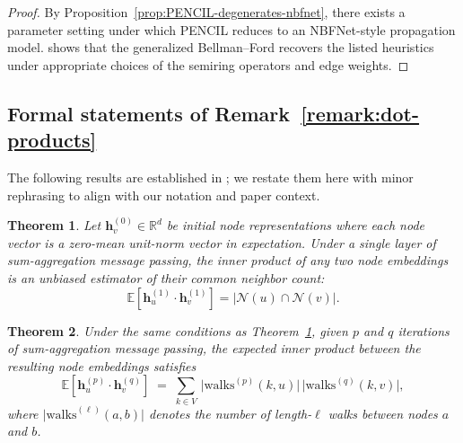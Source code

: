 \documentclass{article}
\theoremstyle{plain}
\newtheorem{theorem}{Theorem}[section]
\theoremstyle{definition}
\theoremstyle{remark}
\begin{document}
\begin{proof}
    By Proposition~\ref{prop:PENCIL-degenerates-nbfnet}, there exists a parameter setting under which PENCIL reduces to an
    NBFNet-style propagation model. \cite{zhu_neural_bellman-ford_2021} shows that the generalized Bellman--Ford recovers the listed heuristics under appropriate choices of the semiring operators and edge weights.
\end{proof}

\subsection{Formal statements of Remark~\ref{remark:dot-products}} \label{app:formal-theorems}

The following results are established in \cite{dong_pure_2024}; we restate them here with minor rephrasing to align with our notation and paper context.

\begin{theorem}{\cite{dong_pure_2024}} \label{thm:common-neighbor-estimation}
    Let $\mathbf{h}_v^{(0)} \in \mathbb{R}^d$ be initial node representations where each node vector is a zero-mean unit-norm vector in expectation. Under a single layer of sum-aggregation message passing, the inner product of any two node embeddings is an unbiased estimator of their common neighbor count:
    \begin{equation}
        \mathbb{E}\!\left[\mathbf{h}_u^{(1)} \cdot \mathbf{h}_v^{(1)}\right] = |\mathcal{N}(u) \cap \mathcal{N}(v)|.
    \end{equation}
\end{theorem}

\begin{theorem}{\cite{dong_pure_2024}} \label{thm:common-neighbor-estimation-general}
    Under the same conditions as Theorem~\ref{thm:common-neighbor-estimation}, given $p$ and $q$ iterations of sum-aggregation message passing, the expected inner product between
    the resulting node embeddings satisfies
    \begin{equation}
        \mathbb{E}\!\left[\mathbf{h}_u^{(p)} \cdot \mathbf{h}_v^{(q)}\right]
        \;=\;
        \sum_{k\in V} \, \big|\mathrm{walks}^{(p)}(k,u)\big| \, \big|\mathrm{walks}^{(q)}(k,v)\big|,
    \end{equation}
    where $\big|\mathrm{walks}^{(\ell)}(a,b)\big|$ denotes the number of length-$\ell$ walks between nodes $a$ and $b$.
\end{theorem}
\end{document}
